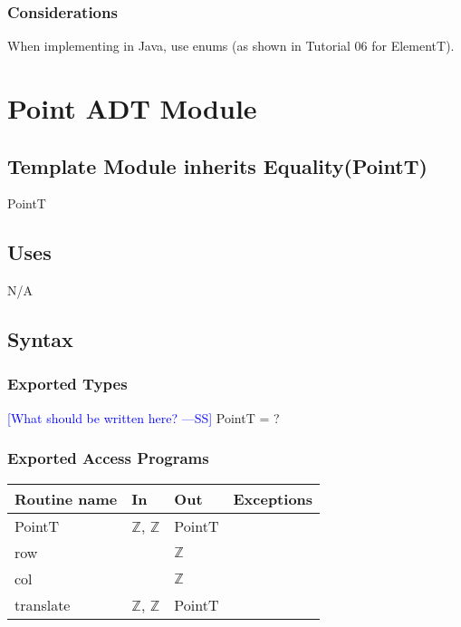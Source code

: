 \documentclass[12pt]{article}
\newcommand{\authornote}[3]{\textcolor{#1}{[#3 ---#2]}}
\newcommand{\authornote}[3]{}
\newcommand{\wss}[1]{\authornote{blue}{SS}{#1}}
\begin{document}
\subsubsection* {Considerations}

When implementing in Java, use enums (as shown in Tutorial 06 for ElementT).

\newpage

\section* {Point ADT Module}

\subsection*{Template Module inherits Equality(PointT)}

PointT

\subsection* {Uses}

N/A

\subsection* {Syntax}

\subsubsection* {Exported Types}


\wss{What should be written here?}  PointT = ?

\subsubsection* {Exported Access Programs}

\begin{tabular}{| l | l | l | l |}
\hline
\textbf{Routine name} & \textbf{In} & \textbf{Out} & \textbf{Exceptions}\\
\hline
PointT & $\mathbb{Z}$, $\mathbb{Z}$ & PointT & \\
\hline
row & ~ & $\mathbb{Z}$ & ~\\
\hline
col & ~ & $\mathbb{Z}$ & ~\\
\hline
translate & $\mathbb{Z}$, $\mathbb{Z}$ & PointT & ~\\
\hline
\end{tabular}
\end{document}
